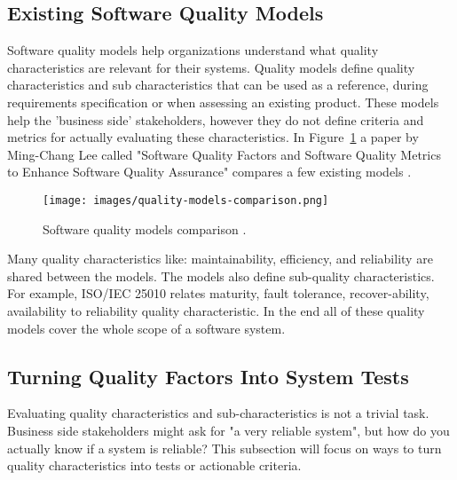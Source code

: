 \documentclass[12pt]{article}
\begin{document}
\subsection{Existing Software Quality Models}
Software quality models help organizations understand what quality characteristics are relevant for their systems. Quality models define quality characteristics and sub characteristics that can be used as a reference, during requirements specification or when assessing an existing product. These models help the 'business side' stakeholders, however they do not define criteria and metrics for actually evaluating these characteristics. In Figure~\ref{fig:quality-models-comparison} a paper by Ming-Chang Lee called "Software Quality Factors and Software Quality Metrics to Enhance Software Quality Assurance" compares a few existing models \cite{Lee14}.
\begin{figure}[H]
    \centering
    \texttt{[image: images/quality-models-comparison.png]}
    \caption{Software quality models comparison \cite{Lee14}.}
    \label{fig:quality-models-comparison}
\end{figure}
Many quality characteristics like: maintainability, efficiency, and reliability are shared between the models. The models also define sub-quality characteristics. For example, ISO/IEC 25010 relates maturity, fault tolerance, recover-ability, availability to reliability quality characteristic. In the end all of these quality models cover the whole scope of a software system.

\subsection{Turning Quality Factors Into System Tests}
Evaluating quality characteristics and sub-characteristics is not a trivial task. Business side stakeholders might ask for "a very reliable system", but how do you actually know if a system is reliable? This subsection will focus on ways to turn quality characteristics into tests or actionable criteria.
\end{document}
